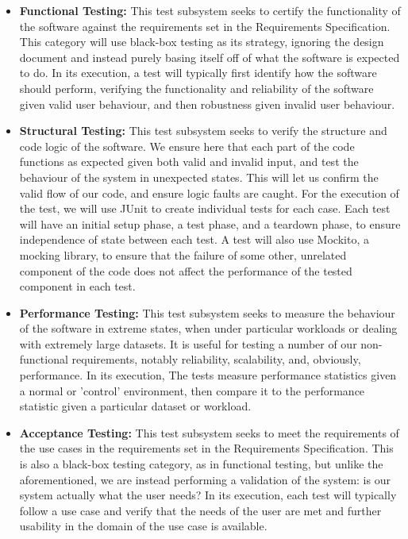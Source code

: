 \documentclass[12pt]{article}
\newcounter{req ID}
\begin{document}
\begin{itemize}
    \item \textbf{Functional Testing:} This test subsystem seeks to certify the functionality of the software against the requirements set in the Requirements Specification. This category will use black-box testing as its strategy, ignoring the design document and instead purely basing itself off of what the software is expected to do. In its execution, a test will typically first identify how the software should perform, verifying the functionality and reliability of the software given valid user behaviour, and then robustness given invalid user behaviour.
    \item \textbf{Structural Testing:} This test subsystem seeks to verify the structure and code logic of the software. We ensure here that each part of the code functions as expected given both valid and invalid input, and test the behaviour of the system in unexpected states. This will let us confirm the valid flow of our code, and ensure logic faults are caught. For the execution of the test, we will use JUnit to create individual tests for each case. Each test will have an initial setup phase, a test phase, and a teardown phase, to ensure independence of state between each test. A test will also use Mockito, a mocking library, to ensure that the failure of some other, unrelated component of the code does not affect the performance of the tested component in each test.
    \item \textbf{Performance Testing:} This test subsystem seeks to measure the behaviour of the software in extreme states, when under particular workloads or dealing with extremely large datasets. It is useful for testing a number of our non-functional requirements, notably reliability, scalability, and, obviously, performance. In its execution, The tests measure performance statistics given a normal or 'control' environment, then compare it to the performance statistic given a particular dataset or workload.
    \item \textbf{Acceptance Testing:} This test subsystem seeks to meet the requirements of the use cases in the requirements set in the Requirements Specification. This is also a black-box testing category, as in functional testing, but unlike the aforementioned, we are instead performing a validation of the system: is our system actually what the user needs? In its execution, each test will typically follow a use case and verify that the needs of the user are met and further usability in the domain of the use case is available.

\end{itemize}
\end{document}
